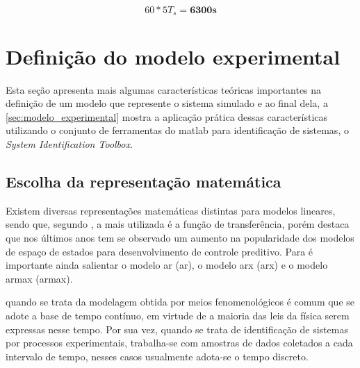 \begin{equation}
	\label{eq:experiment_duration}
	60 * 5T_s = \pmb{6}\pmb{3}\pmb{0}\pmb{0}\pmb{s}
\end{equation}

\section{Definição do modelo experimental}
\label{sec:definicao_modelo_experimental}

Esta seção apresenta mais algumas características teóricas importantes na definição de um modelo
que represente o sistema simulado e ao final dela, a \cref{sec:modelo_experimental}
mostra a aplicação prática dessas características utilizando o conjunto de ferramentas do \acrshort{matlab}
para identificação de sistemas, o \textit{System Identification Toolbox\texttrademark}.

\subsection{Escolha da representação matemática}
\label{subsec:escolha_da_representacao_matematica}

Existem diversas representações matemáticas distintas para modelos lineares, sendo que, segundo
, a mais utilizada é a função de transferência, porém 
destaca que nos últimos anos tem se observado um aumento na popularidade dos modelos de espaço de
estados para desenvolvimento de controle preditivo. Para  é importante ainda
salientar o modelo \acrshort{ar} (\acrlong{ar}), o modelo \acrshort{arx} (\acrlong{arx}) e
o modelo \acrshort{armax} (\acrlong{armax}).

\begin{citacao}
    \text{[...]} quando se trata da modelagem obtida por meios fenomenológicos é comum que se adote a base de
    tempo contínuo, em virtude de a maioria das leis da física serem expressas nesse tempo. Por sua vez,
    quando se trata de identificação de sistemas por processos experimentais, trabalha-se com amostras
    de dados coletados a cada intervalo de tempo, nesses casos usualmente adota-se o tempo discreto.
\end{citacao}

